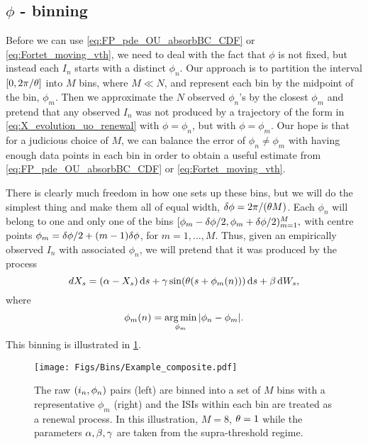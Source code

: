 \subsection{$\phi$ - binning}
Before we can use \cref{eq:FP_pde_OU_absorbBC_CDF} or
\eqref{eq:Fortet_moving_vth}, we need to deal with the fact that $\phi$ is not
fixed, but instead each $I_n$ starts with a distinct $\phi_n$. Our approach is
to partition the interval $[0, 2 \pi/{ \theta}]$ into $M$ bins, where $M \ll N$, and
represent each bin by the midpoint of the bin, $\phi_m$. Then we approximate the
$N$ observed $\phi_n$'s by the closest $\phi_m$ and pretend that any observed
$I_n$ was not produced by a trajectory of the form in
\cref{eq:X_evolution_uo_renewal} with $\phi = \phi_n$, but with $\phi = \phi_m$.
Our hope is that for a judicious choice of $M$, we can balance the error of
$\phi_n \neq \phi_m$ with having enough data points in each bin in order to
obtain a useful estimate from \cref{eq:FP_pde_OU_absorbBC_CDF} or
\eqref{eq:Fortet_moving_vth}.

There is clearly much freedom in how one sets up these bins, but we will do the
simplest thing and make them all of equal width, ${ \delta \phi } = 2 \pi / {({ \theta} M)}$.
Each $\phi_n$ will belong to one and only one of the bins $ [\phi_m - { \delta \phi }/2,
\phi_m + { \delta \phi }/2)_{m=1}^M, $ with centre points $ \phi_m = { \delta \phi } / 2 + (m-1)
{ \delta \phi }$, for $m = 1,\ldots, M$. Thus, given an empirically observed $I_n$ with
associated $\phi_n$, we will pretend that it was produced by the process $$ dX_s
= (\alpha - X_s) \, \mathrm{d} s  + {\gamma } \sin({ \theta} (s+\phi_m(n) ))
\, \mathrm{d} s
+ \beta \, \mathrm{d} W_s, $$ where $$ \phi_m(n)  = \argmin_{\phi_m} {| \phi_n - \phi_m|}.
$$ This binning is illustrated in \cref{fig:binning_visualized}.
\begin{figure}[ht]
\begin{center}
\texttt{[image: Figs/Bins/Example\_composite.pdf]}
  \end{center}
\caption{ The raw $({ i_n}, \phi_n)$ pairs (left) are binned into a set of $M$ bins
with a representative $\phi_m$ (right) and the ISIs within each bin are treated
as a renewal process. In this illustration, $M=8$, ${ \theta} =
1$ while the parameters ${\alpha,\beta,{\gamma } }$ are taken from the
supra-threshold regime. }
\label{fig:binning_visualized} 
\end{figure}

